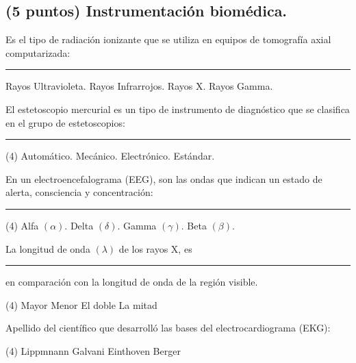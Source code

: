\documentclass[12pt]{exam}
\begin{document}
\begin{questions}
    \section{(5 puntos) Instrumentación biomédica.}

    \question Es el tipo de radiación ionizante que se utiliza en equipos de tomografía axial computarizada: \rule{2cm}{0.1mm}
    \begin{multicols}{2}
    \begin{tasks}
        \task Rayos Ultravioleta.
        \task Rayos Infrarrojos.
        \task Rayos X.
        \task Rayos Gamma.
    \end{tasks}
    \end{multicols}
    \question El estetoscopio mercurial es un tipo de instrumento de diagnóstico que se clasifica en el grupo de estetoscopios: \rule{2cm}{0.1mm}
    \begin{tasks}(4)
        \task Automático.
        \task Mecánico.
        \task Electrónico.
        \task Estándar.
    \end{tasks}
    \question En un electroencefalograma (EEG), son las ondas que indican un estado de alerta, consciencia y concentración: \rule{2cm}{0.1mm}
    \begin{tasks}(4)
        \task Alfa $(\alpha)$.
        \task Delta $(\delta)$.
        \task Gamma $(\gamma)$.
        \task Beta $(\beta)$.
    \end{tasks}
    \question La longitud de onda $(\lambda)$ de los rayos X, es \rule{2cm}{0.1mm} en comparación con la longitud de onda de la región visible.
    \begin{tasks}(4)
        \task Mayor
        \task Menor
        \task El doble
        \task La mitad
    \end{tasks}
    \question Apellido del científico que desarrolló las bases del electrocardiograma (EKG):
    \begin{tasks}(4)
        \task Lippmnann
        \task Galvani
        \task Einthoven
        \task Berger
    \end{tasks}

\end{questions}
\end{document}
